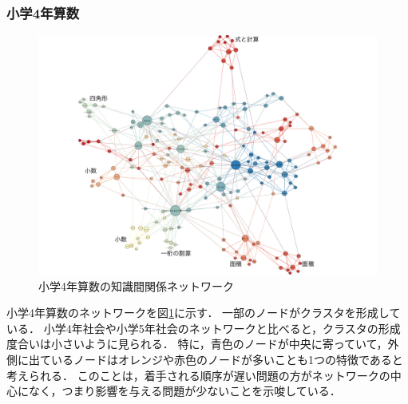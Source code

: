 \subsubsection{小学4年算数}
\begin{figure}[!htb]
\begin{center}
	\includegraphics[width=330pt]{./img/s4_mat_label2.pdf}
	\caption{小学4年算数の知識間関係ネットワーク}
	\label{fig:net_s4mat}
\end{center}
\end{figure}
小学4年算数のネットワークを図\ref{fig:net_s4mat}に示す．
一部のノードがクラスタを形成している．
小学4年社会や小学5年社会のネットワークと比べると，クラスタの形成度合いは小さいように見られる．
特に，青色のノードが中央に寄っていて，外側に出ているノードはオレンジや赤色のノードが多いことも1つの特徴であると考えられる．
このことは，着手される順序が遅い問題の方がネットワークの中心になく，つまり影響を与える問題が少ないことを示唆している．





